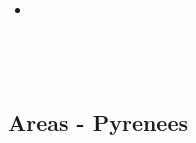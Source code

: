 \begin{scriptsize}
\begin{itemize}
\textcite{livn20} \\
\textcite{chlc20} \\
\textcite{pust20} \\
\textcite{yakl20} \\
\textcite{ghbm20} \\
\textcite{sigh20} \\
\textcite{capi20} \\
\item[\twothousandtwentyone] 
\textcite{famu21} \\
\textcite{pels21} \\
\textcite{pirc21} \\
\textcite{cull21} \\
\end{itemize}
\end{scriptsize}

\subsection{Areas - Pyrenees} 

